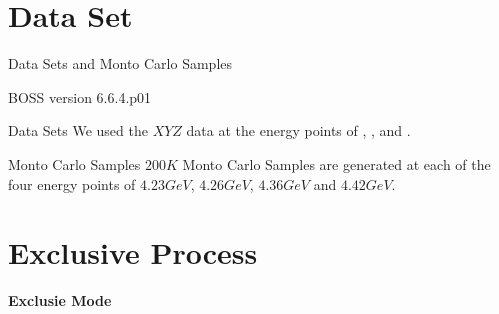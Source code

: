 \documentclass{beamer}
\begin{document}
\section{Data Set}
\begin{frame}{Data Sets and Monto Carlo Samples}
    \begin{block}{BOSS version}
        6.6.4.p01
    \end{block}
    \begin{block}{Data Sets}
        We used the $XYZ$ data at the energy points of \color{red}{$4.23 GeV$}, \color{red}{$4.26 GeV$}, \color{red}{$4.36 GeV$} and \color{red}{$4.42 GeV$}.
    \end{block}
    \begin{block}{Monto Carlo Samples}
        $200 K$ Monto Carlo Samples are generated at each of the four energy points of $4.23 GeV$, $4.26 GeV$, $4.36 GeV$ and $4.42 GeV$.
    \end{block}
\end{frame}
\section{Exclusive Process}
\begin{frame}
    \begin{center}
        \Huge{\bf Exclusie Mode}
    \end{center}
\end{frame}
\end{document}
